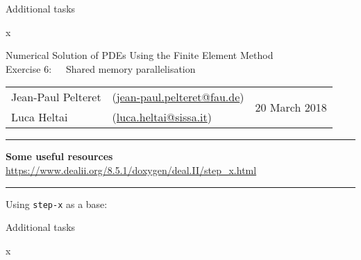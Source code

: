 \documentclass[11pt,answers]{exam}
\makeatletter
\newcommand{\makeheader}[3]{%
\setcounter{question}{0}
\begin{center}
{\sc Numerical Solution of PDEs Using the Finite Element Method}\vspace{2ex}\\
{\sc Exercise #1:\ \ \ #2}\vspace{2ex}\\
\begin{tabular*}{\textwidth}{ll @{\extracolsep{\fill}}r}
Jean-Paul Pelteret & (\url{jean-paul.pelteret@fau.de}) & \multirow{2}{*}{#3} \\
Luca Heltai & (\url{luca.heltai@sissa.it}) & \\
\end{tabular*}
\end{center}
}
\newcommand{\makeresources}[1]{%
\rule{\textwidth}{0.6mm}
\textbf{Some useful resources}\\[1.5ex]
#1 \\
\rule{\textwidth}{0.6mm}
}
\makeatother
\begin{document}
\begin{questions}

\question Additional tasks
\begin{parts}
\bonuspart x
\end{parts}

\end{questions}




\clearpage
\makeheader{6}{Shared memory parallelisation}{20 March 2018}
\makeresources{%
\url{https://www.dealii.org/8.5.1/doxygen/deal.II/step_x.html}
}

\begin{questions}

\question Using \verb|step-x| as a base:


\question Additional tasks
\begin{parts}
\bonuspart x
\end{parts}

\end{questions}
\end{document}
